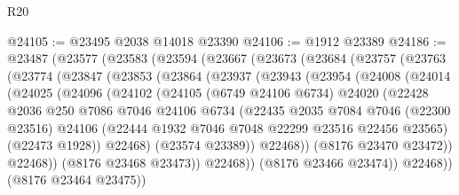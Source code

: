 \begin{lexlean}{R20}
\begin{coremodule}
{@24105 := @23495 @2038 @14018 @23390
@24106 := @1912 @23389
@24186 := @23487
    (@23577
      (@23583
        (@23594
          (@23667
            (@23673
              (@23684
                (@23757
                  (@23763
                    (@23774
                      (@23847
                        (@23853
                          (@23864
                            (@23937
                              (@23943
                                (@23954
                                  (@24008
                                    (@24014
                                      (@24025
                                        (@24096
                                          (@24102
                                            (@24105
                                              (@6749 @24106 @6734)
                                              @24020
                                              (@22428
                                                @2036
                                                @250
                                                @7086
                                                @7046
                                                @24106
                                                @6734
                                                (@22435
                                                  @2035
                                                  @7084
                                                  @7046
                                                  (@22300 @23516)
                                                  @24106
                                                  (@22444
                                                    @1932
                                                    @7046
                                                    @7048
                                                    @22299
                                                    @23516
                                                    @22456
                                                    @23565)
                                                  (@22473 @1928))
                                                @22468)
                                              (@23574 @23389))
                                            @22468))
                                        (@8176 @23470 @23472))
                                      @22468))
                                  (@8176 @23468 @23473))
                                @22468))
                            (@8176 @23466 @23474))
                          @22468))
                      (@8176 @23464 @23475))
}
\end{coremodule}
\end{lexlean}
